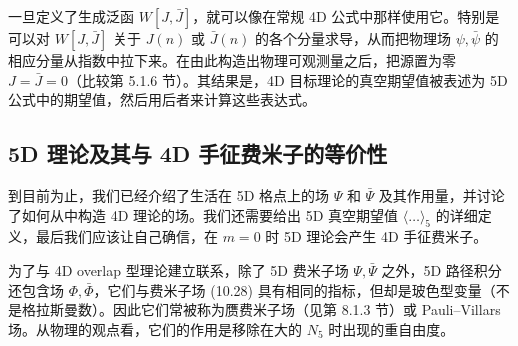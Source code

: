 一旦定义了生成泛函 $W[J, \bar J]$，就可以像在常规 4D 公式中那样使用它。特别是可以对 $W[J, \bar J]$ 关于 $J(n)$ 或 $\bar J(n)$ 的各个分量求导，从而把物理场 $\psi, \bar\psi$ 的相应分量从指数中拉下来。在由此构造出物理可观测量之后，把源置为零 $J = \bar J = 0$（比较第 5.1.6 节）。其结果是，4D 目标理论的真空期望值被表述为 5D 公式中的期望值，然后用后者来计算这些表达式。

\subsection{5D 理论及其与 4D 手征费米子的等价性}

到目前为止，我们已经介绍了生活在 5D 格点上的场 $\Psi$ 和 $\bar\Psi$ 及其作用量，并讨论了如何从中构造 4D 理论的场。我们还需要给出 5D 真空期望值 $\langle\ldots\rangle_5$ 的详细定义，最后我们应该让自己确信，在 $m = 0$ 时 5D 理论会产生 4D 手征费米子。

为了与 4D overlap 型理论建立联系，除了 5D 费米子场 $\Psi, \bar\Psi$ 之外，5D 路径积分还包含场 $\Phi, \bar\Phi$，它们与费米子场 (10.28) 具有相同的指标，但却是玻色型变量（不是格拉斯曼数）。因此它们常被称为赝费米子场（见第 8.1.3 节）或 Pauli--Villars 场。从物理的观点看，它们的作用是移除在大的 $N_5$ 时出现的重自由度。

